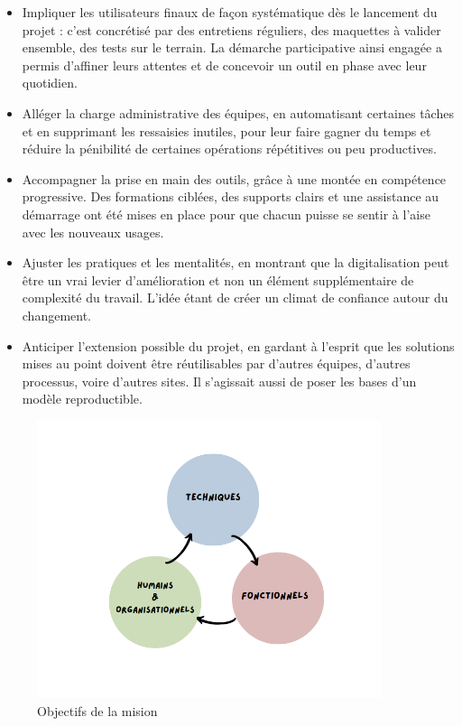 \documentclass[11pt,a4paper]{article}
\begin{document}
\begin{itemize}
    \item Impliquer les utilisateurs finaux de façon systématique dès le lancement du projet : c’est concrétisé par des entretiens réguliers, des maquettes à valider ensemble, des tests sur le terrain. La démarche participative ainsi engagée a permis d’affiner leurs attentes et de concevoir un outil en phase avec leur quotidien.

    \item Alléger la charge administrative des équipes, en automatisant certaines tâches et en supprimant les ressaisies inutiles, pour leur faire gagner du temps et réduire la pénibilité de certaines opérations répétitives ou peu productives.
    
    \item Accompagner la prise en main des outils, grâce à une montée en compétence progressive. Des formations ciblées, des supports clairs et une assistance au démarrage ont été mises en place pour que chacun puisse se sentir à l’aise avec les nouveaux usages.
    
    
    \item Ajuster les pratiques et les mentalités, en montrant que la digitalisation peut être un vrai levier d’amélioration et non un élément supplémentaire de complexité du travail. L’idée étant de créer un climat de confiance autour du changement.
    
    \item Anticiper l’extension possible du projet, en gardant à l’esprit que les solutions mises au point doivent être réutilisables par d’autres équipes, d’autres processus, voire d’autres sites. Il s’agissait aussi de poser les bases d’un modèle reproductible.
    
\end{itemize}

\begin{figure}[H]
  \centering
  \includegraphics[width=0.9\textwidth]{../Images/objectis.png}
  \caption{Objectifs de la mision}
\end{figure}
\end{document}
